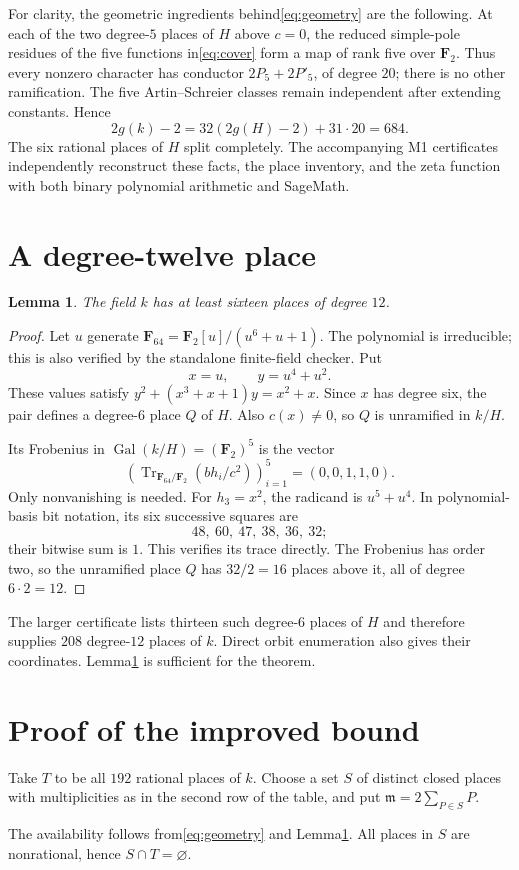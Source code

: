 \documentclass[11pt]{article}
\newtheorem{lemma}[theorem]{Lemma}
\newcommand{\F}{\mathbf F}
\begin{document}
For clarity, the geometric ingredients behind\eqref{eq:geometry} are the
following. At each of the two degree-$5$ places of $H$ above $c=0$, the reduced
simple-pole residues of the five functions in\eqref{eq:cover} form a map of
rank five over $\F_2$. Thus every nonzero character has conductor
$2P_5+2P'_5$, of degree $20$; there is no other ramification. The five
Artin--Schreier classes remain independent after extending constants. Hence
\[
 2g(k)-2=32(2g(H)-2)+31\cdot20=684.
\]
The six rational places of $H$ split completely. The accompanying M1
certificates independently reconstruct these facts, the place inventory, and
the zeta function with both binary polynomial arithmetic and SageMath.

\section{A degree-twelve place}
\begin{lemma}\label{lem:place}
The field $k$ has at least sixteen places of degree $12$.
\end{lemma}
\begin{proof}
Let $u$ generate $\F_{64}=\F_2[u]/(u^6+u+1)$. The polynomial is irreducible;
this is also verified by the standalone finite-field checker. Put
\[
 x=u,\qquad y=u^4+u^2.
\]
These values satisfy $y^2+(x^3+x+1)y=x^2+x$. Since $x$ has degree six,
the pair defines a degree-$6$ place $Q$ of $H$. Also $c(x)\ne0$, so $Q$ is
unramified in $k/H$.

Its Frobenius in $\operatorname{Gal}(k/H)=(\F_2)^5$ is the vector
\[
 \left(\operatorname{Tr}_{\F_{64}/\F_2}(bh_i/c^2)\right)_{i=1}^5
 =(0,0,1,1,0).
\]
Only nonvanishing is needed. For $h_3=x^2$, the radicand is $u^5+u^4$.
In polynomial-basis bit notation, its six successive squares are
\[
 48,\ 60,\ 47,\ 38,\ 36,\ 32;
\]
their bitwise sum is $1$. This verifies its trace directly.
The Frobenius has order two, so the unramified place $Q$ has $32/2=16$
places above it, all of degree $6\cdot2=12$.
\end{proof}
The larger certificate lists thirteen such degree-$6$ places of $H$ and
therefore supplies $208$ degree-$12$ places of $k$. Direct orbit enumeration
also gives their coordinates. Lemma\ref{lem:place} is sufficient for the theorem.

\section{Proof of the improved bound}
Take $T$ to be all $192$ rational places of $k$. Choose a set $S$ of distinct
closed places with multiplicities as in the second row of the table, and put
$\mathfrak m=2\sum_{P\in S}P$.
\begin{center}\end{center}
The availability follows from\eqref{eq:geometry} and Lemma\ref{lem:place}.
All places in $S$ are nonrational, hence $S\cap T=\varnothing$.
\end{document}
